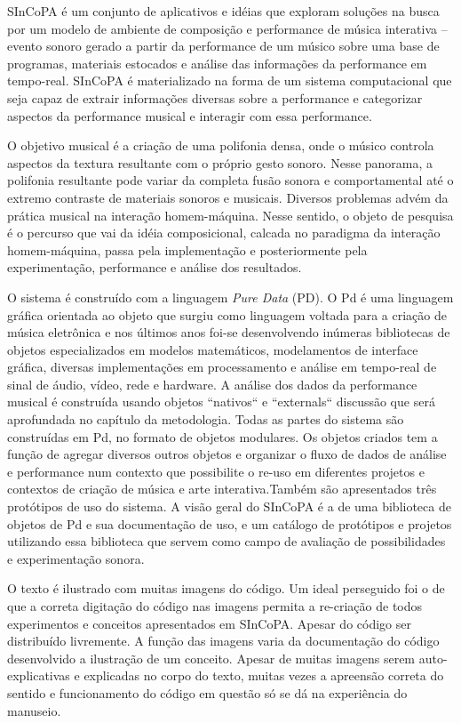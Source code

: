 \documentclass{ppgmus}
\newcommand{\pd}{PD}
\begin{document}
 SInCoPA é um conjunto de aplicativos e idéias que exploram soluções
na busca por um modelo de ambiente de composição e
performance de música interativa – evento sonoro gerado a partir da
performance de um músico sobre uma base de programas, materiais
estocados e análise das informações da performance em tempo-real. SInCoPA
 é materializado na forma de um sistema computacional que seja
capaz de extrair informações diversas sobre a performance e
categorizar aspectos da performance musical e interagir com essa performance.


O objetivo musical é a criação de uma polifonia densa, onde o músico controla
aspectos da textura resultante com o próprio gesto sonoro. Nesse panorama, a
polifonia resultante pode variar da completa fusão sonora e comportamental até o extremo
contraste de materiais sonoros e musicais. Diversos problemas advém da prática
musical na interação homem-máquina. Nesse sentido, o 
objeto de pesquisa é o percurso que vai da idéia composicional, calcada
no paradigma da interação homem-máquina,  passa pela implementação
e posteriormente pela experimentação, performance e análise dos resultados.



O sistema é construído com a linguagem \textit{Pure Data} (\pd). O Pd é uma linguagem gráfica orientada ao objeto que surgiu
como linguagem voltada para a criação de música eletrônica e nos últimos anos foi-se desenvolvendo inúmeras
bibliotecas de objetos especializados em modelos matemáticos, modelamentos de interface gráfica, diversas 
implementações
em processamento e análise em tempo-real de sinal de áudio, vídeo, rede e hardware. 
A análise dos dados da performance musical é construída usando objetos ``nativos`` e ``externals`` 
discussão que será
aprofundada no capítulo da metodologia. 
Todas as partes do sistema são construídas em Pd, no formato de objetos
modulares. Os objetos criados tem a função de agregar diversos outros objetos e organizar o fluxo de dados
de análise e performance num contexto que possibilite o re-uso em diferentes projetos e contextos de 
criação de música e arte interativa.Também são apresentados três protótipos de uso do sistema. A visão geral do
SInCoPA é a de uma biblioteca de objetos de Pd e sua documentação de uso, e um catálogo de protótipos e projetos
utilizando essa biblioteca que servem como campo de avaliação de possibilidades e experimentação sonora.




O texto é ilustrado com muitas imagens do código. Um ideal perseguido foi o de que a correta
digitação do código nas imagens permita a re-criação de todos experimentos e conceitos apresentados
em SInCoPA. Apesar do código ser distribuído livremente.
A função das imagens varia da documentação do código desenvolvido a ilustração de um conceito.
Apesar de muitas imagens serem auto-explicativas e explicadas no corpo do texto, muitas vezes a apreensão 
correta do sentido e funcionamento do código em questão só se dá na experiência do manuseio. 
\end{document}
